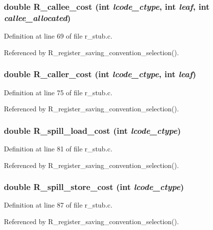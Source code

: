 \subsubsection{\setlength{\rightskip}{0pt plus 5cm}double R\_\-callee\_\-cost (int {\em lcode\_\-ctype}, int {\em leaf}, int {\em callee\_\-allocated})}\label{r__stub_8c_865fa697be175e9009dbfbd0ddbaded3}




Definition at line 69 of file r\_\-stub.c.

Referenced by R\_\-register\_\-saving\_\-convention\_\-selection().
\subsubsection{\setlength{\rightskip}{0pt plus 5cm}double R\_\-caller\_\-cost (int {\em lcode\_\-ctype}, int {\em leaf})}\label{r__stub_8c_06a9b67aa7ff79099512bc9b45121ad0}




Definition at line 75 of file r\_\-stub.c.

Referenced by R\_\-register\_\-saving\_\-convention\_\-selection().
\subsubsection{\setlength{\rightskip}{0pt plus 5cm}double R\_\-spill\_\-load\_\-cost (int {\em lcode\_\-ctype})}\label{r__stub_8c_81182c2e2cc5adf59bae84752b07ad94}




Definition at line 81 of file r\_\-stub.c.

Referenced by R\_\-register\_\-saving\_\-convention\_\-selection().
\subsubsection{\setlength{\rightskip}{0pt plus 5cm}double R\_\-spill\_\-store\_\-cost (int {\em lcode\_\-ctype})}\label{r__stub_8c_b71237561fcf4fc259b3c85f949b14e7}




Definition at line 87 of file r\_\-stub.c.

Referenced by R\_\-register\_\-saving\_\-convention\_\-selection().